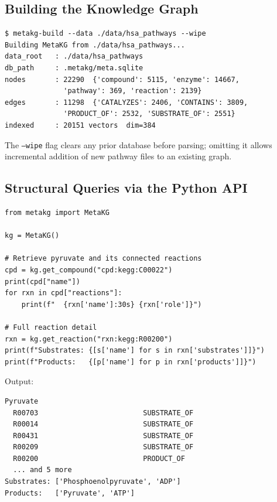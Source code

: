 \documentclass[10pt]{article}
\begin{document}
\subsection{Building the Knowledge Graph}

\begin{lstlisting}[style=bash, caption={Building the complete human metabolome knowledge graph.}]
$ metakg-build --data ./data/hsa_pathways --wipe
Building MetaKG from ./data/hsa_pathways...
data_root   : ./data/hsa_pathways
db_path     : .metakg/meta.sqlite
nodes       : 22290  {'compound': 5115, 'enzyme': 14667,
              'pathway': 369, 'reaction': 2139}
edges       : 11298  {'CATALYZES': 2406, 'CONTAINS': 3809,
              'PRODUCT_OF': 2532, 'SUBSTRATE_OF': 2551}
indexed     : 20151 vectors  dim=384
\end{lstlisting}

The \texttt{--wipe} flag clears any prior database before parsing; omitting it
allows incremental addition of new pathway files to an existing graph.

\subsection{Structural Queries via the Python API}

\begin{lstlisting}[style=python, caption={Compound retrieval and neighbourhood traversal.}]
from metakg import MetaKG

kg = MetaKG()

# Retrieve pyruvate and its connected reactions
cpd = kg.get_compound("cpd:kegg:C00022")
print(cpd["name"])
for rxn in cpd["reactions"]:
    print(f"  {rxn['name']:30s} {rxn['role']}")

# Full reaction detail
rxn = kg.get_reaction("rxn:kegg:R00200")
print(f"Substrates: {[s['name'] for s in rxn['substrates']]}")
print(f"Products:   {[p['name'] for p in rxn['products']]}")
\end{lstlisting}

Output:
\begin{lstlisting}[style=bash, caption={}]
Pyruvate
  R00703                         SUBSTRATE_OF
  R00014                         SUBSTRATE_OF
  R00431                         SUBSTRATE_OF
  R00209                         SUBSTRATE_OF
  R00200                         PRODUCT_OF
  ... and 5 more
Substrates: ['Phosphoenolpyruvate', 'ADP']
Products:   ['Pyruvate', 'ATP']
\end{lstlisting}
\end{document}
